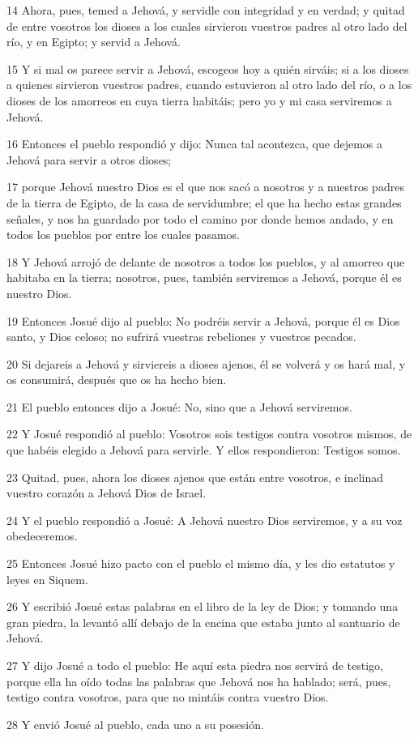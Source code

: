 \par 14 Ahora, pues, temed a Jehová, y servidle con integridad y en verdad; y quitad de entre vosotros los dioses a los cuales sirvieron vuestros padres al otro lado del río, y en Egipto; y servid a Jehová.
\par 15 Y si mal os parece servir a Jehová, escogeos hoy a quién sirváis; si a los dioses a quienes sirvieron vuestros padres, cuando estuvieron al otro lado del río, o a los dioses de los amorreos en cuya tierra habitáis; pero yo y mi casa serviremos a Jehová.
\par 16 Entonces el pueblo respondió y dijo: Nunca tal acontezca, que dejemos a Jehová para servir a otros dioses;
\par 17 porque Jehová nuestro Dios es el que nos sacó a nosotros y a nuestros padres de la tierra de Egipto, de la casa de servidumbre; el que ha hecho estas grandes señales, y nos ha guardado por todo el camino por donde hemos andado, y en todos los pueblos por entre los cuales pasamos.
\par 18 Y Jehová arrojó de delante de nosotros a todos los pueblos, y al amorreo que habitaba en la tierra; nosotros, pues, también serviremos a Jehová, porque él es nuestro Dios.
\par 19 Entonces Josué dijo al pueblo: No podréis servir a Jehová, porque él es Dios santo, y Dios celoso; no sufrirá vuestras rebeliones y vuestros pecados.
\par 20 Si dejareis a Jehová y sirviereis a dioses ajenos, él se volverá y os hará mal, y os consumirá, después que os ha hecho bien.
\par 21 El pueblo entonces dijo a Josué: No, sino que a Jehová serviremos.
\par 22 Y Josué respondió al pueblo: Vosotros sois testigos contra vosotros mismos, de que habéis elegido a Jehová para servirle. Y ellos respondieron: Testigos somos.
\par 23 Quitad, pues, ahora los dioses ajenos que están entre vosotros, e inclinad vuestro corazón a Jehová Dios de Israel.
\par 24 Y el pueblo respondió a Josué: A Jehová nuestro Dios serviremos, y a su voz obedeceremos.
\par 25 Entonces Josué hizo pacto con el pueblo el mismo día, y les dio estatutos y leyes en Siquem.
\par 26 Y escribió Josué estas palabras en el libro de la ley de Dios; y tomando una gran piedra, la levantó allí debajo de la encina que estaba junto al santuario de Jehová.
\par 27 Y dijo Josué a todo el pueblo: He aquí esta piedra nos servirá de testigo, porque ella ha oído todas las palabras que Jehová nos ha hablado; será, pues, testigo contra vosotros, para que no mintáis contra vuestro Dios.
\par 28 Y envió Josué al pueblo, cada uno a su posesión.

